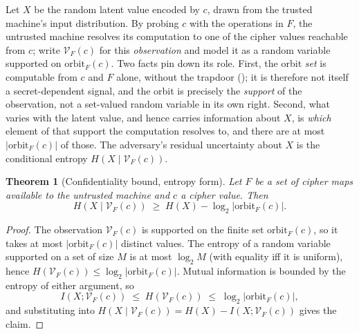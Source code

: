 \documentclass[11pt]{article}
\theoremstyle{definition}
\theoremstyle{plain}
\newtheorem{theorem}{Theorem}[section]
\theoremstyle{remark}
\newcommand{\orbitF}{\mathrm{orbit}_F}
\begin{document}
Let $X$ be the random latent value encoded by $c$, drawn from the
trusted machine's input distribution.
By probing $c$ with the operations in $F$, the untrusted machine
resolves its computation to one of the cipher values reachable from
$c$; write $\mathcal{V}_F(c)$ for this \emph{observation} and model it
as a random variable supported on $\orbitF(c)$.
Two facts pin down its role.
First, the orbit \emph{set} is computable from $c$ and $F$ alone,
without the trapdoor (); it is therefore not
itself a secret-dependent signal, and the orbit is precisely the
\emph{support} of the observation, not a set-valued random variable in
its own right.
Second, what varies with the latent value, and hence carries
information about $X$, is \emph{which} element of that support the
computation resolves to, and there are at most $|\orbitF(c)|$ of those.
The adversary's residual uncertainty about $X$ is the conditional
entropy $H(X \mid \mathcal{V}_F(c))$.

\begin{theorem}[Confidentiality bound, entropy form]
\label{thm:confidentiality-bound}
Let $F$ be a set of cipher maps available to the untrusted machine and
$c$ a cipher value.
Then
\[
H(X \mid \mathcal{V}_F(c)) \;\geq\; H(X) - \log_2 |\orbitF(c)|.
\]
\end{theorem}

\begin{proof}
The observation $\mathcal{V}_F(c)$ is supported on the finite set
$\orbitF(c)$, so it takes at most $|\orbitF(c)|$ distinct values.
The entropy of a random variable supported on a set of size $M$ is at
most $\log_2 M$ (with equality iff it is uniform), hence
$H(\mathcal{V}_F(c)) \leq \log_2 |\orbitF(c)|$.
Mutual information is bounded by the entropy of either argument, so
\[
I(X; \mathcal{V}_F(c)) \;\leq\; H(\mathcal{V}_F(c)) \;\leq\; \log_2 |\orbitF(c)|,
\]
and substituting into
$H(X \mid \mathcal{V}_F(c)) = H(X) - I(X; \mathcal{V}_F(c))$ gives the
claim.
\end{proof}
\end{document}
